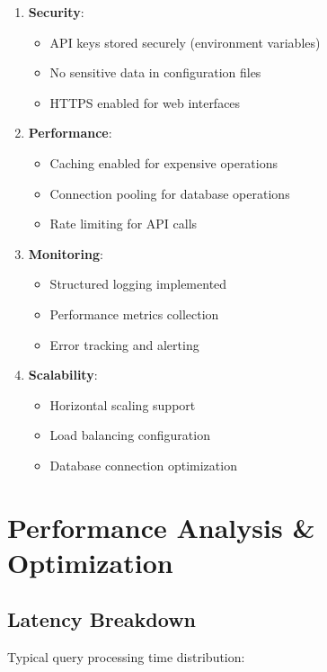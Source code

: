 \documentclass[12pt,a4paper]{article}
\begin{document}
\begin{enumerate}
    \item \textbf{Security}:
    \begin{itemize}
        \item API keys stored securely (environment variables)
        \item No sensitive data in configuration files
        \item HTTPS enabled for web interfaces
    \end{itemize}
    
    \item \textbf{Performance}:
    \begin{itemize}
        \item Caching enabled for expensive operations
        \item Connection pooling for database operations
        \item Rate limiting for API calls
    \end{itemize}
    
    \item \textbf{Monitoring}:
    \begin{itemize}
        \item Structured logging implemented
        \item Performance metrics collection
        \item Error tracking and alerting
    \end{itemize}
    
    \item \textbf{Scalability}:
    \begin{itemize}
        \item Horizontal scaling support
        \item Load balancing configuration
        \item Database connection optimization
    \end{itemize}
\end{enumerate}

\section{Performance Analysis \& Optimization}

\subsection{Latency Breakdown}

Typical query processing time distribution:
\end{document}
